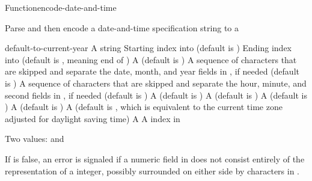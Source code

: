 \documentclass[10pt,twoside,english,pdftex]{article}
\begin{document}
\begin{functiondoc}{Function}{encode-date-and-time}{%
    }
% 

\fnsyntax

\fnpurpose Parse and then encode a date-and-time specification string to a

\fnpackage {} 

\fnmodule {}

\fnargs
\begin{args}{default-to-current-year}
\arg[string] A string
\arg[start] Starting index into  (default is )
\arg[end] Ending index into  (default is \nil, meaning
end of )
 A  (default is \nil)
 A sequence of characters that are skipped and separate the
 date, month, and year fields in , if needed (default is 
 )
 A sequence of characters that are skipped and separate the
 hour, minute, and second fields in , if needed (default is 
 )
 A  (default is 
)
 A  (default is
)
 A  (default is \nil)
 A  (default is 
)
 A  (default is \nil,
  which is equivalent to the current time zone adjusted for daylight
  saving time)
 A  
\arg[position] A index in 
\end{args}

\fnreturns Two values:  and 

\fnerrors
%
If  is false, an error is signaled if a numeric field in
 does not consist entirely of the representation of a integer,
possibly surrounded on either side by characters in .


\end{functiondoc}
\end{document}

